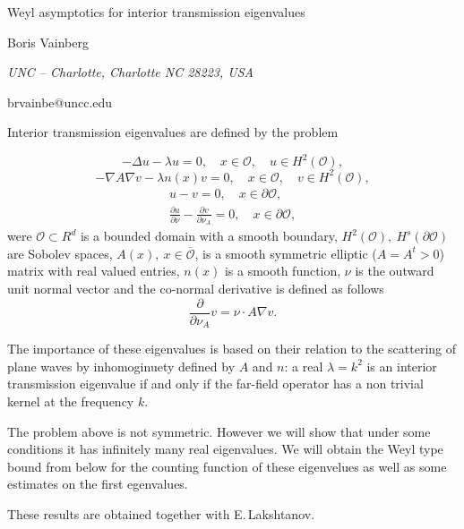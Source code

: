\documentclass[12pt]{article}
\date{}
\begin{document}
\begin{center}

{\Large Weyl asymptotics for interior transmission eigenvalues}

\bigskip

{\sc Boris Vainberg}

{\small\it UNC -- Charlotte, Charlotte NC 28223, USA}

{\small\rm brvainbe@uncc.edu}

\end{center}


\bigskip

Interior transmission eigenvalues are defined by the problem

\begin{equation*}
-\Delta u - \lambda u =0, \quad x \in \mathcal O, \quad u\in H^2(\mathcal O),
\end{equation*}
\begin{equation*}
-\nabla A \nabla v - \lambda   n(x)v =0, \quad x \in \mathcal O, \quad v\in H^2(\mathcal O),
\end{equation*}
\begin{equation*}
\begin{array}{l}
u-v=0, \quad x \in \partial \mathcal O, \\
\frac{\partial u}{\partial \nu} - \frac{\partial v}{\partial \nu_A}=0, \quad x \in \partial \mathcal O,
\end{array}
\end{equation*}
were $\mathcal O\subset R^d$ is a bounded domain with a smooth boundary, $H^{2}(\mathcal O), ~H^{s}(\partial \mathcal O)$ are Sobolev spaces, $A(x),~x\in \overline{\mathcal O}$, is a smooth symmetric elliptic ($A=A^t>0$) matrix with real valued entries, $n(x)$ is   a smooth function, $\nu$ is the outward unit normal vector and the co-normal derivative is defined as follows
$$
\frac{\partial } {\partial \nu_A}v =\nu \cdot A \nabla v.
$$

The importance of these eigenvalues is based on their relation to the scattering of plane waves by inhomoginuety defined by $A$ and $n$: a real $\lambda=k^2$ is an interior transmission eigenvalue if and only if the far-field operator has a non trivial kernel at the frequency $k$.

The problem above is not symmetric. However we will show that under some conditions it has infinitely many real eigenvalues. We will obtain the Weyl type bound from below for the counting function of these eigenvelues as well as some estimates on the first egenvalues.

These results are obtained together with E.\,Lakshtanov.
\end{document}
